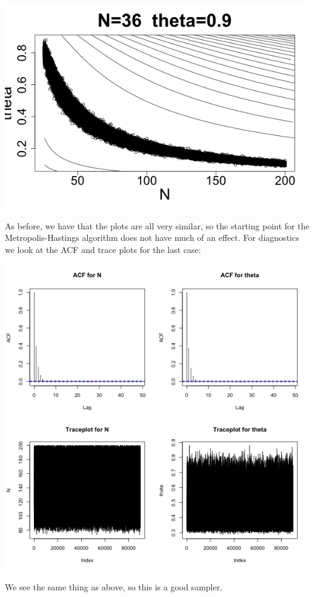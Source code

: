 \documentclass[letterpaper,10pt]{amsart}
\begin{document}
\begin{enumerate}[{1}.1]
\begin{center}
\includegraphics[scale=0.25]{Stat221Impala10.png}
\end{center}
As before, we have that the plots are all very similar, so the starting point for the Metropolis-Hastings algorithm does not have much of an effect. For diagnostics we look at the ACF and trace plots for the last case: 
\begin{center}
\includegraphics[scale=0.75]{Stat221WaterbuckDiag.png}
\end{center}
We see the same thing as above, so this is a good sampler.



\end{enumerate}
\end{document}
